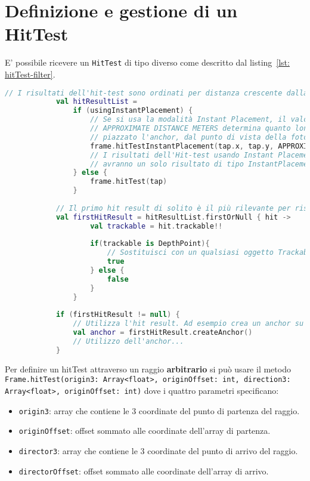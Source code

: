 \documentclass[crop=false, class=book]{standalone}
\begin{document}
	\section{Definizione e gestione di un HitTest}
	E' possibile ricevere un \verb|HitTest| di tipo diverso come descritto dal listing~\vref{lst: hitTest-filter}.
	\begin{center}
		\begin{minipage}{0.95\textwidth}
			\begin{lstlisting}[caption={Filtraggio hitTest in base al tipo.}, label={lst: hitTest-filter}, language=Kotlin]
			// I risultati dell'hit-test sono ordinati per distanza crescente dalla fotocamera.
			val hitResultList =
  				if (usingInstantPlacement) {
    				// Se si usa la modalità Instant Placement, il valore in 
    				// APPROXIMATE DISTANCE METERS determina quanto lontano sarà 
    				// piazzato l'anchor, dal punto di vista della fotocamera.
    				frame.hitTestInstantPlacement(tap.x, tap.y, APPROXIMATE_DISTANCE_METERS)
    				// I risultati dell'Hit-test usando Instant Placement 
    				// avranno un solo risultato di tipo InstantPlacementResult.
  				} else {
    				frame.hitTest(tap)
  				}
  				
			// Il primo hit result di solito è il più rilevante per rispondere agli input dell'utente.
			val firstHitResult = hitResultList.firstOrNull { hit ->
  					val trackable = hit.trackable!!
  					
  					if(trackable is DepthPoint){
  						// Sostituisci con un qualsiasi oggetto Trackable
  						true
  					} else {
  						false
  					}
  				}
  				
			if (firstHitResult != null) {
  				// Utilizza l'hit result. Ad esempio crea un anchor su tale punto di interesse.
  				val anchor = firstHitResult.createAnchor()
  				// Utilizzo dell'anchor...
			}
			\end{lstlisting}
		\end{minipage}
	\end{center}
	
	
	\noindent
	Per definire un hitTest attraverso un raggio \textbf{arbitrario} si può usare il metodo \verb|Frame.hitTest(origin3: Array<float>, originOffset: int, direction3:| \\
	\verb|Array<float>, originOffset: int)| dove i quattro parametri specificano:
	
	\begin{itemize}
		\item \verb|origin3|: array che contiene le 3 coordinate del punto di partenza del raggio.
		\item \verb|originOffset|: offset sommato alle coordinate dell'array di partenza.
		\item \verb|director3|: array che contiene le 3 coordinate del punto di arrivo del raggio.
		\item \verb|directorOffset|: offset sommato alle coordinate dell'array di arrivo.
	\end{itemize}
	
\end{document}
